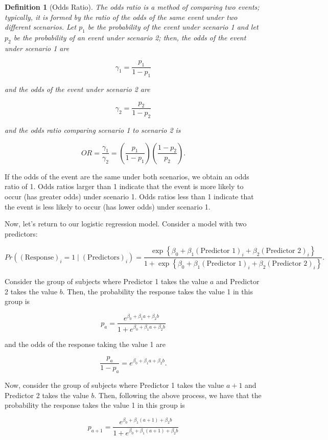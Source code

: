 \documentclass[
]{book}
\theoremstyle{plain}
\theoremstyle{mydefn}
\newtheorem{definition}{Definition}[chapter]
\theoremstyle{myexmpl}
\theoremstyle{remark}
\begin{document}
\begin{definition}[Odds Ratio]
The odds ratio is a method of comparing two events; typically, it is formed by the ratio of the odds of the same event under two different scenarios. Let \(p_1\) be the probability of the event under scenario 1 and let \(p_2\) be the probability of an event under scenario 2; then, the odds of the event under scenario 1 are

\[\gamma_1 = \frac{p_1}{1 - p_1}\]

and the odds of the event under scenario 2 are

\[\gamma_2 = \frac{p_2}{1 - p_2}\]

and the odds ratio comparing scenario 1 to scenario 2 is

\[OR = \frac{\gamma_1}{\gamma_2} = \left(\frac{p_1}{1 - p_1}\right) \left(\frac{1 - p_2}{p_2}\right).\]
\end{definition}

If the odds of the event are the same under both scenarios, we obtain an odds ratio of 1. Odds ratios larger than 1 indicate that the event is more likely to occur (has greater odds) under scenario 1. Odds ratios less than 1 indicate that the event is less likely to occur (has lower odds) under scenario 1.

Now, let's return to our logistic regression model. Consider a model with two predictors:

\[Pr\left((\text{Response})_i = 1 \mid (\text{Predictors})_i \right) = \frac{\exp\left\{\beta_0 + \beta_1 (\text{Predictor 1})_i + \beta_2 (\text{Predictor 2})_i\right\}}{1 + \exp\left\{\beta_0 + \beta_1 (\text{Predictor 1})_i + \beta_2 (\text{Predictor 2})_i\right\}}.\]

Consider the group of subjects where Predictor 1 takes the value \(a\) and Predictor 2 takes the value \(b\). Then, the probability the response takes the value 1 in this group is

\[p_a = \frac{e^{\beta_0 + \beta_1 a + \beta_2 b}}{1 + e^{\beta_0 + \beta_1 a + \beta_2 b}}\]

and the odds of the response taking the value 1 are

\[\frac{p_a}{1 - p_a} = e^{\beta_0 + \beta_1 a + \beta_2 b}.\]

Now, consider the group of subjects where Predictor 1 takes the value \(a + 1\) and Predictor 2 takes the value \(b\). Then, following the above process, we have that the probability the response takes the value 1 in this group is

\[p_{a+1} = \frac{e^{\beta_0 + \beta_1 (a + 1) + \beta_2 b}}{1 + e^{\beta_0 + \beta_1 (a + 1)+ \beta_2 b}}\]
\end{document}
